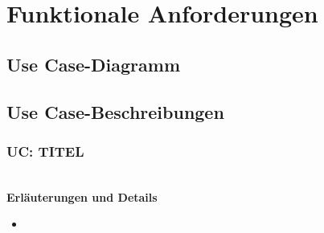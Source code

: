 \section{Funktionale Anforderungen}


\subsection{Use Case-Diagramm}


\pagebreak

\subsection{Use Case-Beschreibungen}




\subsubsection{UC: TITEL}


\\[0.5cm]
\textbf{Erläuterungen und Details}
\begin{itemize}
    \item 
\end{itemize}

